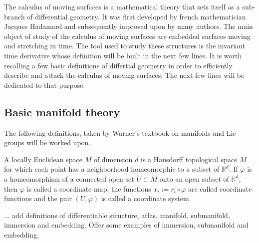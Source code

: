 \documentclass[../main.tex]{subfiles}
\begin{document}
    The calculus of moving surfaces is a mathematical theory that sets itself as a sub-branch of differential geometry. It was first developed by french mathematician Jacques Hadamard and subsequently improved upon by many authors. The main object of study of the calculus of moving surfaces are embedded surfaces moving and stretching in time. The tool used to study these structures is the invariant time derivative whose definition will be built in the next few lines. It is worth recalling a few basic definitions of differtial geometry in order to efficiently describe and attack the calculus of moving surfaces. The next few lines will be dedicated to that purpose.
    
    \subsection{Basic manifold theory}
    The following definitions, taken by Warner's textbook on manifolds and Lie groups \cite{warner2013foundations} will be worked upon. 
    \begin{dfn}
        A locally Euclidean space $M$ of dimension $d$ is a Hausdorff topological space $M$ for which each point has a neighborhood homeomorphic to a subset of $\mathbb{R}^{d}$.  If $\varphi$ is a homeomorphism of a connected open set $U \subset M$ onto an open subset of $\mathbb{R}^{d}$, then $\varphi$ is called a coordinate map, the functions $x_i:=r_{i}\circ \varphi$ are called coordinate functions and the pair $(U,\varphi)$ is called a coordinate system.
    \end{dfn}
    ... add definitions of differentiable structure, atlas, manifold, submanifold, immersion and embedding. Offer some examples of immersion, submanifold and embedding.
    
\end{document}
